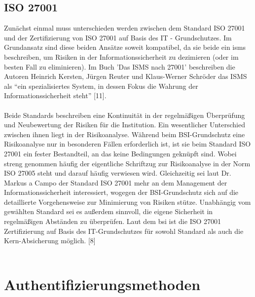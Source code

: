 \subsection{ISO 27001}
Zunächst einmal muss unterschieden werden zwischen dem Standard ISO 27001 und der Zertifizierung von ISO 27001 auf Basis des IT - Grundschutzes. Im Grundansatz sind diese beiden Ansätze soweit kompatibel, da sie beide ein \ac{isms} beschreiben, um Risiken in der Informationssicherheit zu dezimieren (oder im besten Fall zu eliminieren). Im Buch 'Das ISMS nach 27001' beschreiben die Autoren Heinrich Kersten, Jürgen Reuter und Klaus-Werner Schröder das ISMS als ``ein spezialisiertes System, in dessen Fokus die Wahrung der Informationssicherheit steht'' [11]. \\\\
Beide Standards beschreiben eine Kontinuität in der regelmäßigen Überprüfung und Neubewertung der Risiken für die Institution. Ein wesentlicher Unterschied zwischen ihnen liegt in der Risikoanalyse. Während beim BSI-Grundschutz eine Risikoanalyse nur in besonderen Fällen erforderlich ist, ist sie beim Standard ISO 27001 ein fester Bestandteil, an das keine Bedingungen geknüpft sind. Wobei streng genommen häufig der eigentliche Schriftzug zur Risikoanalyse in der Norm ISO 27005 steht und darauf häufig verwiesen wird. Gleichzeitig sei laut Dr. Markus a Campo der Standard ISO 27001 mehr an dem Management der Informationssicherheit interessiert, wogegen der BSI-Grundschutz sich auf die detaillierte Vorgehensweise zur Minimierung von Risiken stütze. Unabhängig vom gewählten Standard sei es außerdem sinnvoll, die eigene Sicherheit in regelmäßigen Abständen zu überprüfen.
Laut dem \ac{bsi} ist die ISO 27001 Zertifizierung auf Basis des IT-Grundschutzes für sowohl Standard als auch die Kern-Absicherung möglich. [8] \\\\

\section{Authentifizierungsmethoden}
